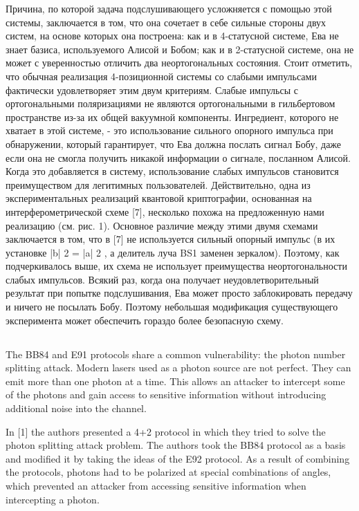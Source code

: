 Причина, по которой задача подслушивающего усложняется с помощью этой системы, заключается в том, что она сочетает в себе сильные стороны двух систем, на основе которых она построена: как и в 4-статусной системе, Ева не знает базиса, используемого Алисой и Бобом; как и в 2-статусной системе, она не может с уверенностью отличить два неортогональных состояния. Стоит отметить, что обычная реализация 4-позиционной системы со слабыми импульсами фактически удовлетворяет этим двум критериям. Слабые импульсы с ортогональными поляризациями не являются ортогональными в гильбертовом пространстве из-за их общей вакуумной компоненты. Ингредиент, которого не хватает в этой системе, - это использование сильного опорного импульса при обнаружении, который гарантирует, что Ева должна послать сигнал Бобу, даже если она не смогла получить никакой информации о сигнале, посланном Алисой. Когда это добавляется в систему, использование слабых импульсов становится преимуществом для легитимных пользователей. Действительно, одна из экспериментальных реализаций квантовой криптографии, основанная на интерферометрической схеме [7], несколько похожа на предложенную нами реализацию (см. рис. 1). Основное различие между этими двумя схемами заключается в том, что в [7] не используется сильный опорный импульс (в их установке |b| 2 = |a| 2 , а делитель луча BS1 заменен зеркалом). Поэтому, как подчеркивалось выше, их схема не использует преимущества неортогональности слабых импульсов. Всякий раз, когда она получает неудовлетворительный результат при попытке подслушивания, Ева может просто заблокировать передачу и ничего не посылать Бобу. Поэтому небольшая модификация существующего эксперимента может обеспечить гораздо более безопасную схему.

\subsection{\review}

The BB84 and E91 protocols share a common vulnerability: the photon number splitting attack. Modern lasers used as a photon source are not perfect. They can emit more than one photon at a time. This allows an attacker to intercept some of the photons and gain access to sensitive information without introducing additional noise into the channel.

In [1] the authors presented a 4+2 protocol in which they tried to solve the photon splitting attack problem. The authors took the BB84 protocol as a basis and modified it by taking the ideas of the E92 protocol. As a result of combining the protocols, photons had to be polarized at special combinations of angles, which prevented an attacker from accessing sensitive information when intercepting a photon.

